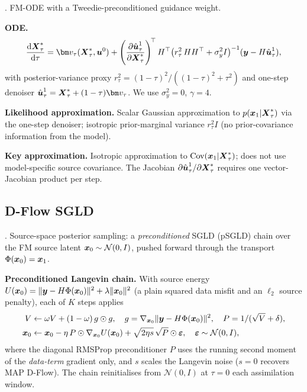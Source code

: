 \cite{pokle_training-free_2024}. FM-ODE with a Tweedie-preconditioned guidance weight.

\textbf{ODE.}
\begin{align}
  \frac{\rd\bXstar_\tau}{\rd\tau}
  = \fmvel_\tau(\bXstar_\tau,\state^0)
  + \left(\frac{\partial\hat{\state}^1_\tau}{\partial\bXstar_\tau}\right)^{\!\top}
    \obsmatrix^\top
    \bigl(r_\tau^2\,\obsmatrix\obsmatrix^\top + \sigma_y^2 I\bigr)^{-1}
    (\obs - \obsmatrix\hat{\state}^1_\tau),
\end{align}
with posterior-variance proxy $r_\tau^2 = (1-\tau)^2/((1-\tau)^2+\tau^2)$ and
one-step denoiser $\hat{\state}^1_\tau = \bXstar_\tau + (1-\tau)\fmvel_\tau$. We use $\sigma_y^2=0$, $\gamma=4$.

\textbf{Likelihood approximation.}
Scalar Gaussian approximation to $p(\boldsymbol{x}_1|\boldsymbol{X}^{*}_\tau)$ via the one-step denoiser; isotropic prior-marginal variance $r_\tau^2 I$ (no prior-covariance information from the model).

\textbf{Key approximation.}
Isotropic approximation to $\text{Cov}(\boldsymbol{x}_1|\boldsymbol{X}^{*}_\tau)$; does not use model-specific source covariance.
The Jacobian $\partial\hat{\boldsymbol{u}}^1_\tau/\partial\boldsymbol{X}^{*}_\tau$ requires one vector-Jacobian product per step.

\subsection{D-Flow SGLD}\label{appendix:method:dflow}

\cite{parikh_d-flow_2026,ben-hamu_d-flow_2024}. Source-space posterior sampling: a \emph{preconditioned} SGLD (pSGLD) chain over the FM source latent $\boldsymbol{x}_0\sim\mathcal{N}(0,I)$, pushed forward through the transport $\Phi(\boldsymbol{x}_0)=\boldsymbol{x}_1$.

\textbf{Preconditioned Langevin chain.}
With source energy $U(\boldsymbol{x}_0)=\|\boldsymbol{y}-H\Phi(\boldsymbol{x}_0)\|^2+\lambda\|\boldsymbol{x}_0\|^2$ (a plain squared data misfit and an $\ell_2$ source penalty), each of $K$ steps applies
\begin{align}
  V &\leftarrow \omega V+(1-\omega)\,g\odot g,\quad g=\nabla_{\boldsymbol{x}_0}\|\boldsymbol{y}-H\Phi(\boldsymbol{x}_0)\|^2,\quad P=1/(\sqrt{V}+\delta),\\
  \boldsymbol{x}_0 &\leftarrow \boldsymbol{x}_0-\eta\,P\odot\nabla_{\boldsymbol{x}_0}U(\boldsymbol{x}_0)+\sqrt{2\eta s}\,\sqrt{P}\odot\boldsymbol\varepsilon,\quad \boldsymbol\varepsilon\sim\mathcal{N}(0,I),
\end{align}
where the diagonal RMSProp preconditioner $P$ uses the running second moment of the \emph{data-term} gradient only, and $s$ scales the Langevin noise ($s{=}0$ recovers MAP D-Flow). The chain reinitialises from $\mathcal{N}(0,I)$ at $\tau=0$ each assimilation window.

